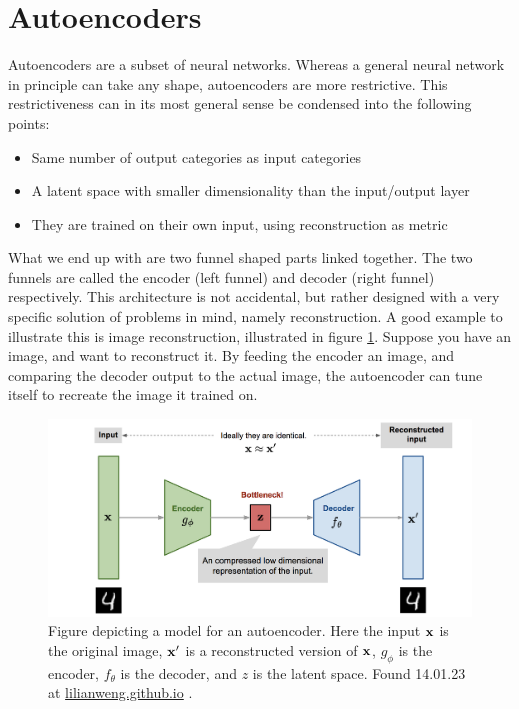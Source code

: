 \section{Autoencoders}\label{sec:autoencder_theory}
Autoencoders are a subset of neural networks. Whereas a general neural network
 in principle can take any shape, autoencoders are more restrictive.
This restrictiveness can in its most general sense be condensed 
into the following points:
\begin{itemize}
    \item Same number of output categories as input categories  
    \item A latent space with smaller dimensionality than the input/output layer  
    \item They are trained on their own input, using reconstruction as metric
\end{itemize}
What we end up with are two funnel shaped parts linked together. The two funnels are 
called the encoder (left funnel) and decoder (right funnel) respectively. This architecture is not 
accidental, but rather designed with a very specific solution of problems in mind, namely reconstruction. 
A good example to illustrate this is image reconstruction, illustrated in figure \ref{fig:ae_denoise}. 
Suppose you have an image, and want to reconstruct it. By feeding the encoder an image, 
and comparing the decoder output to the actual image, the autoencoder can tune itself to recreate the image it trained on. 

\begin{figure}[H]
    \includegraphics[width=\linewidth]{Figures/Machinelearning/autoencoder_imagedenoising.png}
    \caption[Conceptual autoencoder]{Figure depicting a model for an autoencoder. Here the input $\bf{x}$ is the original image, $\bf{x'}$ is a reconstructed version of $\bf{x}$, $g_{\phi}$ is the encoder, $f_{\theta}$ is the decoder, and $z$ is the latent space. Found 14.01.23 at \href{https://lilianweng.github.io/posts/2018-08-12-vae/autoencoder-architecture.png}{lilianweng.github.io} \cite{weng2018VAE}. }
    \label{fig:ae_denoise}
\end{figure}

